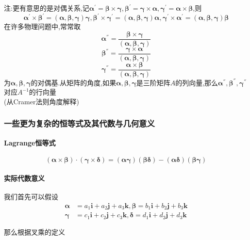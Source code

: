 \documentclass{article}
\newcommand{\ve}{\boldsymbol}
\begin{document}
\begin{CJK}{UTF8}{gkai}
注:更有意思的是对偶关系,记$\ve{\alpha}^{'}=\ve{\beta}\times\ve{\gamma},\ve{\beta}^{'}=\ve{\gamma}\times\ve{\alpha},\ve{\gamma}^{'}=\ve{\alpha}\times\ve{\beta}$,则\\
\[\ve{\alpha}^{'}\times\ve{\beta}^{'}=(\ve{\alpha},\ve{\beta},\ve{\gamma})\ve{\gamma},\ve{\beta}^{'}\times\ve{\gamma}^{'}=(\ve{\alpha},\ve{\beta},\ve{\gamma})\ve{\alpha},\ve{\gamma}^{'}\times\ve{\alpha}^{'}=(\ve{\alpha},\ve{\beta},\ve{\gamma})\ve{\beta}\]
在许多物理问题中,常常取
\[\ve{\alpha}^{''}=\dfrac{\ve{\beta}\times\ve{\gamma}}{(\ve{\alpha},\ve{\beta},\ve{\gamma})}\]
\[\ve{\beta}^{''}=\dfrac{\ve{\gamma}\times\ve{\alpha}}{(\ve{\alpha},\ve{\beta},\ve{\gamma})}\]
\[\ve{\gamma}^{''}=\dfrac{\ve{\alpha}\times\ve{\beta}}{(\ve{\alpha},\ve{\beta},\ve{\gamma})}\]
为$\ve{\alpha},\ve{\beta},\ve{\gamma}$的对偶基.从矩阵的角度,如果$\ve{\alpha},\ve{\beta},\ve{\gamma}$是三阶矩阵$A$的列向量,那么$\ve{\alpha}^{''},\ve{\beta}^{''},\ve{\gamma}^{''}$对应$A^{-1}$的行向量\\
(从Cramer法则角度解释)\\




\subsubsection*{一些更为复杂的恒等式及其代数与几何意义}
\paragraph{Lagrange恒等式\\}

\[(\ve{\alpha}\times\ve{\beta})\cdot(\ve{\gamma}\times\ve{\delta})=(\ve{\alpha}\ve{\gamma})(\ve{\beta}\ve{\delta})-(\ve{\alpha}\ve{\delta})(\ve{\beta}\ve{\gamma})\]

\paragraph{实际代数意义\\}

我们首先可以假设
\[
\begin{aligned}    
\ve{\alpha}&=a_1\ve{i}+a_2\ve{j}+a_3\ve{k},\ve{\beta}=b_1\ve{i}+b_2\ve{j}+b_3\ve{k}\\
\ve{\gamma}&=c_1\ve{i}+c_2\ve{j}+c_3\ve{k},\ve{\delta}=d_1\ve{i}+d_2\ve{j}+d_3\ve{k}
\end{aligned}\]


那么根据叉乘的定义\\


\end{CJK}
\end{document}
